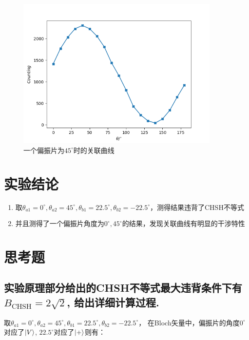 \documentclass[a4paper,UTF8]{ctexart}
\begin{document}
\begin{figure}[H]
    \centering
    \begin{minipage}[b]{0.9\textwidth}
        \centering
        \includegraphics[width=0.9\textwidth]{./2.png}
        \caption{一个偏振片为$45^{\circ}$时的关联曲线}
        \label{2}
    \end{minipage}
\end{figure}

\section{实验结论}

\begin{enumerate}
    \item 取$\theta_{a1} = 0^{\circ},\theta_{a2} = 45^{\circ},\theta_{b1} = 22.5^{\circ},\theta_{b2} = -22.5^{\circ}$，测得结果违背了CHSH不等式
    \item 并且测得了一个偏振片角度为$0^{\circ},45^{\circ}$的结果，发现关联曲线有明显的干涉特性
\end{enumerate}

\section{思考题}

\subsection{实验原理部分给出的CHSH不等式最大违背条件下有$B_{\mathrm{CHSH}}=2\sqrt{2}$, 给出详细计算过程.}

取$\theta_{a1} = 0^{\circ},\theta_{a2} = 45^{\circ},\theta_{b1} = 22.5^{\circ},\theta_{b2} = -22.5^{\circ}$，
在Bloch矢量中，偏振片的角度$0^{\circ}$对应了$\ket{V}$, $22.5^{\circ}$对应了$\ket{+}$则有：
\end{document}
